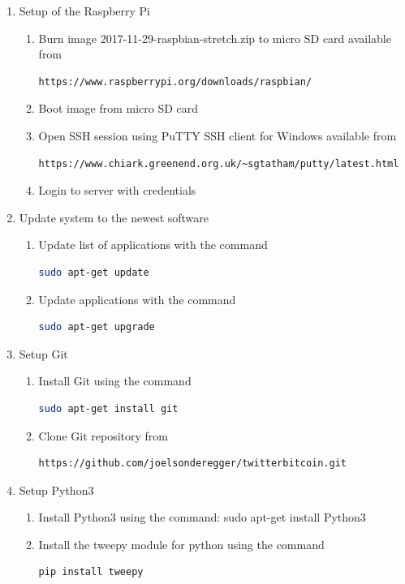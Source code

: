 \documentclass[a4paper,12pt]{article}
\begin{document}
\begin{spacing}{1.2}
\begin{enumerate}
\item Setup of the Raspberry Pi
\begin{enumerate}
\item Burn image 2017-11-29-raspbian-stretch.zip to micro SD card available from
\begin{lstlisting}[language=bash]
https://www.raspberrypi.org/downloads/raspbian/
\end{lstlisting}
\item Boot image from micro SD card 
\item Open SSH session using PuTTY SSH client for Windows available from
\begin{lstlisting}[language=bash] 
https://www.chiark.greenend.org.uk/~sgtatham/putty/latest.html
\end{lstlisting}
\item Login to server with credentials 
\end{enumerate}

\item Update system to the newest software
\begin{enumerate}
\item Update list of applications with the command
\begin{lstlisting}[language=bash]
sudo apt-get update
\end{lstlisting}
\item Update applications with the command
\begin{lstlisting}[language=bash]
sudo apt-get upgrade
\end{lstlisting}
\end{enumerate}

\item Setup Git
\begin{enumerate}
\item Install Git using the command
\begin{lstlisting}[language=bash]
 sudo apt-get install git
\end{lstlisting}
\item Clone Git repository from
\begin{lstlisting}[language=bash] 
https://github.com/joelsonderegger/twitterbitcoin.git
\end{lstlisting}
\end{enumerate}

\item Setup Python3
\begin{enumerate}
\item Install Python3 using the command: sudo apt-get install Python3 \newline
\item Install the tweepy module for python using the command
\begin{lstlisting}[language=bash]
pip install tweepy
\end{lstlisting}
\end{enumerate}


\end{enumerate}
\end{spacing}
\end{document}
